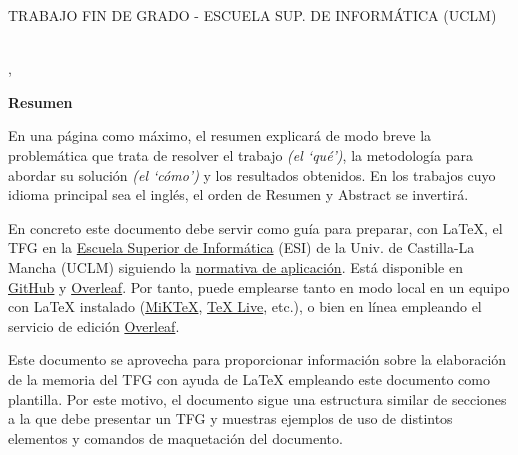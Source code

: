 \pagestyle{plain}	%

%
% 
%

\makeatletter
\begin{center} %
   {\textsc{TRABAJO FIN DE GRADO - ESCUELA SUP. DE INFORMÁTICA (UCLM)}\par} %
   \vspace{1cm} %
   {\textbf{\Large\@tituloCorto}\par}  %
   \vspace{0.4cm} %
   {\@autor \\ \@cityTF,{} \@mesTF{} \@yearTF\par} 
   \vspace{0.9cm} %
   {\textbf{\large\textsf{Resumen}}\par} %
\end{center}   
\makeatother %
En una página como máximo, el resumen explicará de modo breve la problemática que trata de resolver el trabajo \emph{(el `qué')}, la metodología para  abordar su solución  \emph{(el `cómo')} y los resultados obtenidos. En los trabajos cuyo idioma principal sea el inglés, el orden de \textsf{Resumen} y \textsf{Abstract} se invertirá.

En concreto este documento debe servir como guía para preparar, con LaTeX, el TFG en la \href{http://webpub.esi.uclm.es/}{Escuela Superior de Informática} (ESI) de la Univ. de Castilla-La Mancha (UCLM) siguiendo la \href{https://pruebasaluuclm.sharepoint.com/sites/esicr/tfg/SitePages/Inicio.aspx}{normativa de aplicación}. Está disponible en \href{https://github.com/JesusSalido/TFG_ESI_UCLM}{GitHub} y \href{https://www.overleaf.com/latex/templates/plantilla-de-tfg-escuela-superior-de-informatica-uclm/phjgscmfqtsw}{Overleaf}. Por tanto, puede emplearse tanto en modo local en un equipo con LaTeX instalado (\href{https://miktex.org/}{MiKTeX}, \href{https://www.tug.org/texlive/}{TeX Live}, etc.), o bien en línea empleando el servicio de edición \href{https://www.overleaf.com/latex/templates/plantilla-de-tfg-escuela-superior-de-informatica-uclm/phjgscmfqtsw}{Overleaf}.

Este documento se aprovecha para proporcionar información sobre la elaboración de la memoria del TFG con ayuda de \LaTeX{} empleando este documento como plantilla. Por este motivo, el documento sigue una estructura similar de secciones a la que debe presentar un TFG y muestras ejemplos de uso de distintos elementos y comandos de maquetación del documento.

